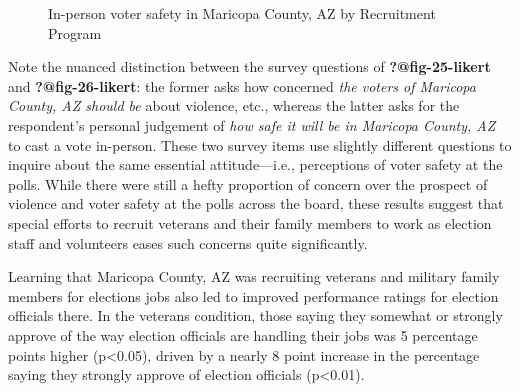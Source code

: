\documentclass[
  11pt,
  a4paper,
]{article}
\begin{document}
\begin{figure}

\caption{\label{fig-q26-likert}In-person voter safety in Maricopa
County, AZ by Recruitment Program}


\end{figure}%

Note the nuanced distinction between the survey questions of
\textbf{?@fig-25-likert} and \textbf{?@fig-26-likert}: the former asks
how concerned \emph{the voters of Maricopa County, AZ should be} about
violence, etc., whereas the latter asks for the respondent's personal
judgement of \emph{how safe it will be in Maricopa County, AZ} to cast a
vote in-person. These two survey items use slightly different questions
to inquire about the same essential attitude---i.e., perceptions of
voter safety at the polls. While there were still a hefty proportion of
concern over the prospect of violence and voter safety at the polls
across the board, these results suggest that special efforts to recruit
veterans and their family members to work as election staff and
volunteers eases such concerns quite significantly.

Learning that Maricopa County, AZ was recruiting veterans and military
family members for elections jobs also led to improved performance
ratings for election officials there. In the veterans condition, those
saying they somewhat or strongly approve of the way election officials
are handling their jobs was 5 percentage points higher (p\textless0.05),
driven by a nearly 8 point increase in the percentage saying they
strongly approve of election officials (p\textless0.01).
\end{document}
